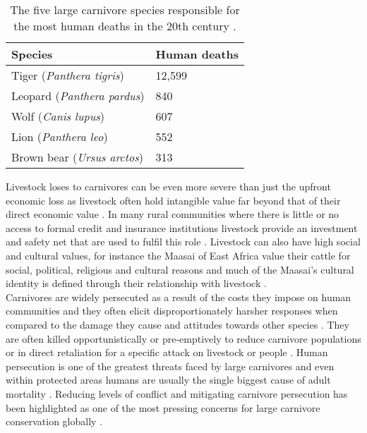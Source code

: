 \begin{table}[h]
	\small
	\begin{center}
		\begin{tabular}{l l}
			\hline \hline		
			Species 				& Human deaths\\ \hline
			Tiger (\textit{Panthera tigris})				& 12,599\\
			Leopard 	(\textit{Panthera pardus})			& 840\\
			Wolf	 (\textit{Canis lupus})			 		& 607\\
			Lion	 (\textit{Panthera leo})					& 552\\
			Brown bear (\textit{Ursus arctos}) 			& 313\\
			\hline \hline						
		\end{tabular}
		\caption{The five large carnivore species responsible for the most human deaths in the 20th century \citep{Loe2004a}.}
	\label{table:Deaths}
	\end{center}
\end{table}

Livestock loses to carnivores can be even more severe than just the upfront economic loss as livestock often hold intangible value far beyond that of their direct economic value \citep{Kansky2014e}. In many rural communities where there is little or no access to formal credit and insurance institutions livestock provide an investment and safety net that are used to fulfil this role \citep{Kurosaki1995,Andrew2003}. Livestock can also have high social and cultural values, for instance the Maasai of East Africa value their cattle for social, political, religious and cultural reasons and much of the Maasai's cultural identity is defined through their relationship with livestock \citep{Galaty2016a}.\\

Carnivores are widely persecuted as a result of the costs they impose on human communities \citep{Dickman2010b,dickman2013human,loveridge2010people,Woodroffe2005} and they often elicit disproportionately harsher responses when compared to the damage they cause and attitudes towards other species \citep{Kansky2014e,Dickman2010b}. They are often killed opportunistically or pre-emptively to reduce carnivore populations or in direct retaliation for a specific attack on livestock or people \citep{Thirgood2005}. Human persecution is one of the greatest threats faced by large carnivores and even within protected areas humans are usually the single biggest cause of adult mortality \citep{Woodroffe1998}. Reducing levels of conflict and mitigating carnivore persecution has been highlighted as one of the most pressing concerns for large carnivore conservation globally \citep{Woodroffe1998,Ray2005}.\\

